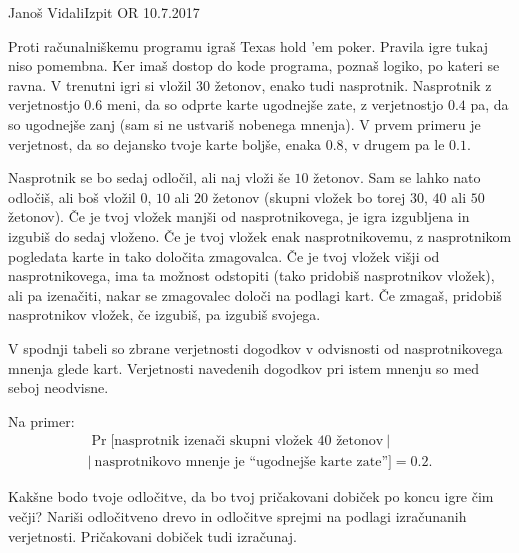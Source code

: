 \begin{naloga}{Janoš Vidali}{Izpit OR 10.7.2017}
\begin{vprasanje}
Proti računalniškemu programu igraš Texas hold 'em poker.
Pravila igre tukaj niso pomembna.
Ker imaš dostop do kode programa, poznaš logiko, po kateri se ravna.
V trenutni igri si vložil $30$ žetonov, enako tudi nasprotnik.
Nasprotnik z verjetnostjo $0.6$ meni, da so odprte karte ugodnejše zate,
z verjetnostjo $0.4$ pa, da so ugodnejše zanj
(sam si ne ustvariš nobenega mnenja).
V prvem primeru je verjetnost, da so dejansko tvoje karte boljše, enaka $0.8$,
v drugem pa le $0.1$.

Nasprotnik se bo sedaj odločil, ali naj vloži še $10$ žetonov.
Sam se lahko nato odločiš, ali boš vložil $0$, $10$ ali $20$ žetonov
(skupni vložek bo torej $30$, $40$ ali $50$ žetonov).
Če je tvoj vložek manjši od nasprotnikovega,
je igra izgubljena in izgubiš do sedaj vloženo.
Če je tvoj vložek enak na\-sprot\-ni\-ko\-ve\-mu,
z nasprotnikom pogledata karte in tako določita zmagovalca.
Če je tvoj vložek višji od nasprotnikovega,
ima ta možnost odstopiti (tako pridobiš nasprotnikov vložek),
ali pa izenačiti, nakar se zmagovalec določi na podlagi kart.
Če zmagaš, pridobiš nasprotnikov vložek,
če izgubiš, pa izgubiš svojega.

V spodnji tabeli so zbrane verjetnosti dogodkov
v odvisnosti od nasprotnikovega mnenja glede kart.
Verjetnosti navedenih dogodkov pri istem mnenju so med seboj neodvisne.
\begin{center}
\end{center}
Na primer:
\begin{multline*}
\Pr[\text{nasprotnik izenači skupni vložek $40$ žetonov} \ | \\
| \ \text{nasprotnikovo mnenje je ``ugodnejše karte zate''}] = 0.2 .
\end{multline*}

Kakšne bodo tvoje odločitve,
da bo tvoj pričakovani dobiček po koncu igre čim večji?
Nariši odločitveno drevo
in odločitve sprejmi na podlagi izračunanih verjetnosti.
Pričakovani dobiček tudi izračunaj.
\end{vprasanje}
\begin{odgovor}
\end{odgovor}
\end{naloga}


